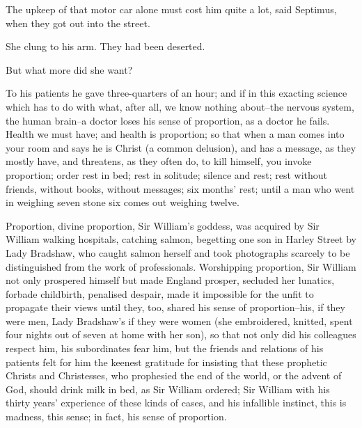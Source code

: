 \documentclass[lang=cn,10pt]{elegantbook}
\begin{document}
The upkeep of that motor car alone must cost him quite a lot, said
Septimus, when they got out into the street.

She clung to his arm.  They had been deserted.

But what more did she want?

To his patients he gave three-quarters of an hour; and if in this
exacting science which has to do with what, after all, we know
nothing about--the nervous system, the human brain--a doctor loses
his sense of proportion, as a doctor he fails.  Health we must
have; and health is proportion; so that when a man comes into your
room and says he is Christ (a common delusion), and has a message,
as they mostly have, and threatens, as they often do, to kill
himself, you invoke proportion; order rest in bed; rest in
solitude; silence and rest; rest without friends, without books,
without messages; six months' rest; until a man who went in
weighing seven stone six comes out weighing twelve.

Proportion, divine proportion, Sir William's goddess, was acquired
by Sir William walking hospitals, catching salmon, begetting one
son in Harley Street by Lady Bradshaw, who caught salmon herself
and took photographs scarcely to be distinguished from the work of
professionals.  Worshipping proportion, Sir William not only
prospered himself but made England prosper, secluded her lunatics,
forbade childbirth, penalised despair, made it impossible for the
unfit to propagate their views until they, too, shared his sense of
proportion--his, if they were men, Lady Bradshaw's if they were
women (she embroidered, knitted, spent four nights out of seven at
home with her son), so that not only did his colleagues respect
him, his subordinates fear him, but the friends and relations of
his patients felt for him the keenest gratitude for insisting that
these prophetic Christs and Christesses, who prophesied the end of
the world, or the advent of God, should drink milk in bed, as Sir
William ordered; Sir William with his thirty years' experience of
these kinds of cases, and his infallible instinct, this is madness,
this sense; in fact, his sense of proportion.
\end{document}
